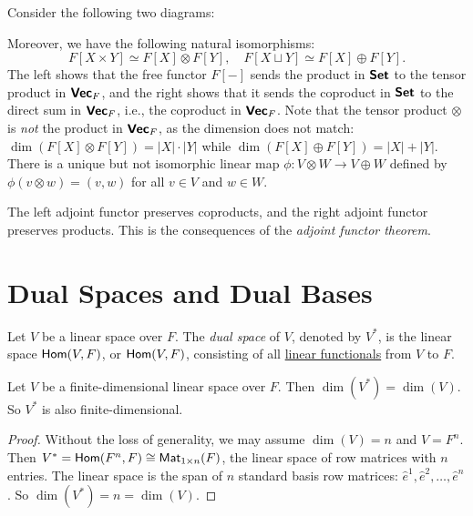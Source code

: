 Consider the following two diagrams:
\begin{center}
  \qquad
\end{center}
Moreover, we have the following natural isomorphisms:
\[
  F[X \times Y] \simeq F[X] \otimes F[Y], \quad F[X \sqcup Y] \simeq F[X] \oplus F[Y].
\]
The left shows that the free functor $F[-]$ sends the product in $\operatorname{\text{\normalfont\bf\sffamily Set}}$ to the tensor product in $\operatorname{\text{\normalfont\bf\sffamily Vec}}_F$, and the right shows that it sends the coproduct in $\operatorname{\text{\normalfont\bf\sffamily Set}}$ to the direct sum in $\operatorname{\text{\normalfont\bf\sffamily Vec}}_F$, i.e., the coproduct in $\operatorname{\text{\normalfont\bf\sffamily Vec}}_F$. Note that the tensor product $\otimes$ is \emph{not} the product in $\operatorname{\text{\normalfont\bf\sffamily Vec}}_F$, as the dimension does not match: $\dim(F[X] \otimes F[Y]) = |X| \cdot |Y|$ while $\dim(F[X] \oplus F[Y]) = |X| + |Y|$. There is a unique but not isomorphic linear map $\phi \colon V \otimes W \to V \oplus W$ defined by $\phi(v \otimes w) = (v, w)$ for all $v \in V$ and $w \in W$.
\begin{remark}
  The left adjoint functor preserves coproducts, and the right adjoint functor preserves products. This is the consequences of the \emph{adjoint functor theorem}.
\end{remark}

\section{Dual Spaces and Dual Bases}

\begin{definition}\label{def:dual_space}
  Let $V$ be a linear space over $F$. The \emph{dual space} of $V$, denoted by $V^*$, is the linear space $\operatorname{\text{\normalfont\sffamily Hom}}(V, F)$, or $\operatorname{\text{\normalfont\sffamily Hom}}(V, F)$, consisting of all \hyperref[def:linear_functional]{linear functionals} from $V$ to $F$.
\end{definition}

\begin{proposition}
  Let $V$ be a finite-dimensional linear space over $F$. Then $\dim(V^*) = \dim(V)$. So $V^*$ is also finite-dimensional.
\end{proposition}
\begin{proof}
  Without the loss of generality, we may assume $\dim(V) = n$ and $V = F^n$. Then $V^* = \operatorname{\text{\normalfont\sffamily Hom}}(F^n, F) \cong \operatorname{\text{\normalfont\sffamily Mat}}_{1 \times n}(F)$, the linear space of row matrices with $n$ entries. The linear space is the span of $n$ standard basis row matrices: $\hat{e}^1, \hat{e}^2, \ldots, \hat{e}^n$. So $\dim(V^*) = n = \dim(V)$.
\end{proof}

